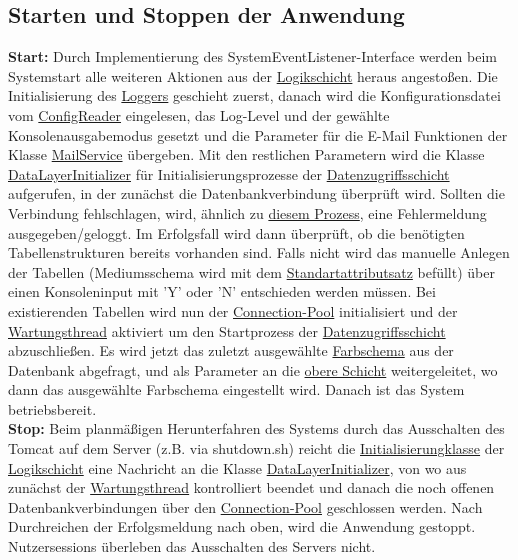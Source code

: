 \documentclass{article}
\begin{document}
\subsection{Starten und Stoppen der Anwendung}
\noindent \textbf{Start:} Durch \hypertarget{Init}{Implementierung} des SystemEventListener-Interface werden beim Systemstart alle weiteren Aktionen aus der \hyperlink{Logikschicht}{Logikschicht} heraus angestoßen. Die Initialisierung des \hyperlink{Logger}{Loggers} geschieht zuerst, danach wird die Konfigurationsdatei vom \hyperlink{Logger}{ConfigReader} eingelesen, das Log-Level und der gewählte Konsolenausgabemodus gesetzt und die Parameter für die E-Mail Funktionen der Klasse \hyperlink{Email}{MailService} übergeben. Mit den restlichen Parametern wird die Klasse \hyperlink{DAOInit}{DataLayerInitializer} für Initialisierungsprozesse der \hyperlink{DAOs}{Datenzugriffsschicht} aufgerufen, in der zunächst die Datenbankverbindung überprüft wird. Sollten die Verbindung fehlschlagen, wird, ähnlich zu \hyperlink{Fehlersequenz}{diesem Prozess}, eine Fehlermeldung ausgegeben/geloggt. Im Erfolgsfall wird dann überprüft, ob die benötigten Tabellenstrukturen bereits vorhanden sind. Falls nicht wird das manuelle Anlegen der Tabellen (Mediumsschema wird mit dem \hyperlink{Standartattributsatz}{Standartattributsatz} befüllt) über einen Konsoleninput mit 'Y' oder 'N' entschieden werden müssen. Bei existierenden Tabellen wird  nun der \hyperlink{Logger}{Connection-Pool} initialisiert und der \hyperlink{Logger}{Wartungsthread} aktiviert um den Startprozess der \hyperlink{DAOs}{Datenzugriffsschicht} abzuschließen. Es wird jetzt das zuletzt ausgewählte \hyperlink{Farbschemaattribut}{Farbschema} aus der Datenbank abgefragt, und als Parameter an die \hyperlink{Logikschicht}{obere Schicht} weitergeleitet, wo dann das ausgewählte Farbschema eingestellt wird. Danach ist das System betriebsbereit. \\
\textbf{Stop:} Beim planmäßigen Herunterfahren des Systems durch das Ausschalten des Tomcat auf dem Server (z.B. via shutdown.sh) reicht die \hyperlink{Init}{Initialisierungklasse} der \hyperlink{Logikschicht}{Logikschicht} eine Nachricht an die Klasse \hyperlink{Logger}{DataLayerInitializer}, von wo aus zunächst der \hyperlink{Logger}{Wartungsthread} kontrolliert beendet und danach die noch offenen Datenbankverbindungen über den \hyperlink{ConnectionPool}{Connection-Pool} geschlossen werden. Nach Durchreichen der Erfolgsmeldung nach oben, wird die Anwendung gestoppt. Nutzersessions überleben das Ausschalten des Servers nicht.
\end{document}
